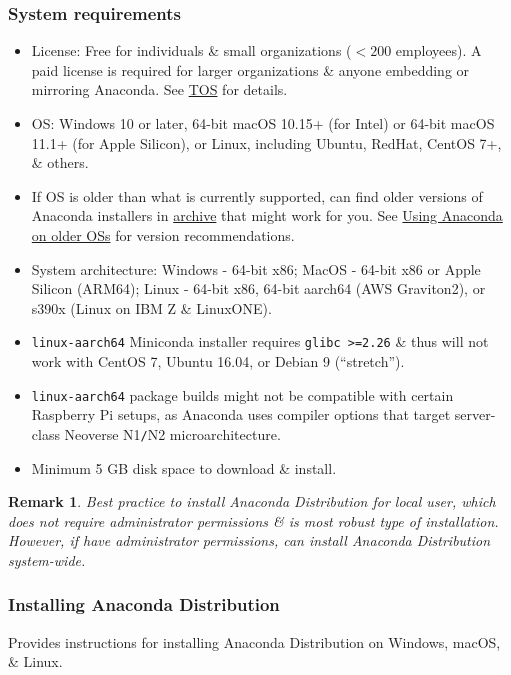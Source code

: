 \documentclass{article}
\newtheorem{remark}{Remark}
\begin{document}
\subsubsection{System requirements}

\begin{itemize}
	\item License: Free for individuals \& small organizations ($< 200$ employees). A paid license is required for larger organizations \& anyone embedding or mirroring Anaconda. See \href{https://legal.anaconda.com/policies/en/}{TOS} for details.
	\item OS: Windows 10 or later, 64-bit macOS 10.15+ (for Intel) or 64-bit macOS 11.1+ (for Apple Silicon), or Linux, including Ubuntu, RedHat, CentOS 7+, \& others.
	\item If OS is older than what is currently supported, can find older versions of Anaconda installers in \href{https://repo.anaconda.com/archive/}{archive} that might work for you. See \href{https://docs.anaconda.com/anaconda/advanced-install/old-os/#older-versions-distro}{Using Anaconda on older OSs} for version recommendations.
	\item System architecture: Windows - 64-bit x86; MacOS - 64-bit x86 or Apple Silicon (ARM64); Linux - 64-bit x86, 64-bit aarch64 (AWS Graviton2), or s390x (Linux on IBM Z \& LinuxONE).
	\item {\tt linux-aarch64} Miniconda installer requires {\tt glibc >=2.26} \& thus will not work with CentOS 7, Ubuntu 16.04, or Debian 9 (``stretch'').
	\item {\tt linux-aarch64} package builds might not be compatible with certain Raspberry Pi setups, as Anaconda uses compiler options that target server-class Neoverse N1{\tt/}N2 microarchitecture.
	\item Minimum 5 GB disk space to download \& install.
\end{itemize}

\begin{remark}
	Best practice to install Anaconda Distribution for local user, which does not require administrator permissions \& is most robust type of installation. However, if have administrator permissions, can install Anaconda Distribution system-wide.
\end{remark}

\subsubsection{Installing Anaconda Distribution}
Provides instructions for installing Anaconda Distribution on Windows, macOS, \& Linux.
\end{document}
